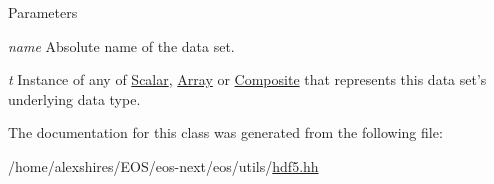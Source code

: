 \begin{DoxyParams}{Parameters}
\item[{\em name}]Absolute name of the data set. \item[{\em t}]Instance of any of \hyperlink{classeos_1_1hdf5_1_1Scalar}{Scalar}, \hyperlink{classeos_1_1hdf5_1_1Array}{Array} or \hyperlink{classeos_1_1hdf5_1_1Composite}{Composite} that represents this data set's underlying data type. \end{DoxyParams}


The documentation for this class was generated from the following file:\begin{DoxyCompactItemize}
\item 
/home/alexshires/EOS/eos-\/next/eos/utils/\hyperlink{hdf5_8hh}{hdf5.hh}\end{DoxyCompactItemize}
